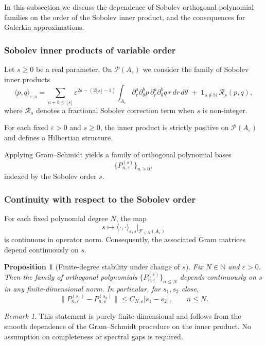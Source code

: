 \documentclass[11pt]{amsart}
\theoremstyle{plain}
\newtheorem{proposition}[theorem]{Proposition}
\theoremstyle{definition}
\theoremstyle{remark}
\newtheorem{remark}[theorem]{Remark}
\theoremstyle{remark}
\begin{document}
In this subsection we discuss the dependence of Sobolev orthogonal polynomial
families on the order of the Sobolev inner product, and the consequences for
Galerkin approximations.

\subsubsection{Sobolev inner products of variable order}

Let $s\ge0$ be a real parameter.
On $\mathcal P(A_\varepsilon)$ we consider the family of Sobolev inner products
\[
\langle p,q\rangle_{\varepsilon,s}
=
\sum_{a+b\le \lfloor s\rfloor}
\varepsilon^{2a-(2\lfloor s\rfloor-1)}
\int_{A_\varepsilon}
\partial_r^a\partial_\theta^b p\,
\overline{\partial_r^a\partial_\theta^b q}\,
r\,dr\,d\theta
\;+\;
\mathbf 1_{s\notin\mathbb N}\,\mathcal R_s(p,q),
\]
where $\mathcal R_s$ denotes a fractional Sobolev correction term when $s$ is
non-integer.

For each fixed $\varepsilon>0$ and $s\ge0$, the inner product is strictly
positive on $\mathcal P(A_\varepsilon)$ and defines a Hilbertian structure.

Applying Gram--Schmidt yields a family of orthogonal polynomial bases
\[
\bigl\{P_{n,\varepsilon}^{(s)}\bigr\}_{n\ge0},
\]
indexed by the Sobolev order $s$.

\subsubsection{Continuity with respect to the Sobolev order}

For each fixed polynomial degree $N$, the map
\[
s \longmapsto \langle\cdot,\cdot\rangle_{\varepsilon,s}
\big|_{\mathcal P_{\le N}(A_\varepsilon)}
\]
is continuous in operator norm.
Consequently, the associated Gram matrices depend continuously on $s$.

\begin{proposition}[Finite-degree stability under change of $s$]
\label{prop:sobolev-order-stability}
Fix $N\in\mathbb N$ and $\varepsilon>0$.
Then the family of orthogonal polynomials
$\{P_{n,\varepsilon}^{(s)}\}_{n\le N}$ depends continuously on $s$ in any
finite-dimensional norm.
In particular, for $s_1,s_2$ close,
\[
\|P_{n,\varepsilon}^{(s_1)}-P_{n,\varepsilon}^{(s_2)}\|
\le C_{N,\varepsilon}|s_1-s_2|,
\qquad n\le N.
\]
\end{proposition}

\begin{remark}
This statement is purely finite-dimensional and follows from the smooth
dependence of the Gram--Schmidt procedure on the inner product.
No assumption on completeness or spectral gaps is required.
\end{remark}
\end{document}
